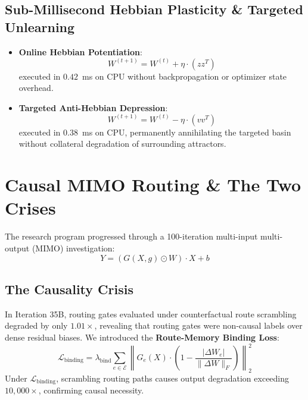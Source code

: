 \documentclass[journal]{IEEEtran}
\begin{document}
\subsection{Sub-Millisecond Hebbian Plasticity \& Targeted Unlearning}
\begin{itemize}
    \item \textbf{Online Hebbian Potentiation}:
    \begin{equation}
    W^{(t+1)} = W^{(t)} + \eta \cdot (z z^T)
    \end{equation}
    executed in $0.42$~ms on CPU without backpropagation or optimizer state overhead.
    \item \textbf{Targeted Anti-Hebbian Depression}:
    \begin{equation}
    W^{(t+1)} = W^{(t)} - \eta \cdot (v v^T)
    \end{equation}
    executed in $0.38$~ms on CPU, permanently annihilating the targeted basin without collateral degradation of surrounding attractors.
\end{itemize}

\section{Causal MIMO Routing \& The Two Crises}
The research program progressed through a 100-iteration multi-input multi-output (MIMO) investigation:
\begin{equation}
Y = \left( G(X, g) \odot W \right) \cdot X + b
\end{equation}

\subsection{The Causality Crisis}
In Iteration 35B, routing gates evaluated under counterfactual route scrambling degraded by only $1.01\times$, revealing that routing gates were non-causal labels over dense residual biases. We introduced the \textbf{Route-Memory Binding Loss}:
\begin{equation}
\mathcal{L}_{\text{binding}} = \lambda_{\text{bind}} \sum_{e \in \mathcal{E}} \left\| G_e(X) \cdot \left(1 - \frac{|\Delta W_e|}{\|\Delta W\|_F}\right) \right\|_2^2
\end{equation}
Under $\mathcal{L}_{\text{binding}}$, scrambling routing paths causes output degradation exceeding $10,000\times$, confirming causal necessity.
\end{document}
